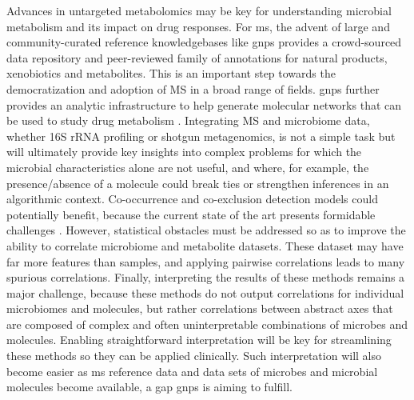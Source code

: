 Advances in untargeted metabolomics may be key for understanding microbial metabolism and its impact on drug responses. For \gls{ms}, the advent of large and community-curated reference knowledgebases like \gls{gnps} \cite{RN4182} provides a crowd-sourced data repository and peer-reviewed family of annotations for natural products, xenobiotics and metabolites. This is an important step towards the democratization and adoption of MS in a broad range of fields. \Gls{gnps} further provides an analytic infrastructure to help generate molecular networks \cite{RN4183} that can be used to study drug metabolism \cite{RN4184}. Integrating MS and microbiome data, whether 16S rRNA profiling or shotgun metagenomics, is not a simple task but will ultimately provide key insights into complex problems for which the microbial characteristics alone are not useful, and where, for example, the presence/absence of a molecule could break ties or strengthen inferences in an algorithmic context. Co-occurrence and co-exclusion detection models could potentially benefit, because the current state of the art presents formidable challenges \cite{RN4186, RN4185}. However, statistical obstacles must be addressed so as to improve the ability to  correlate microbiome and metabolite datasets. These dataset may have far more features than samples, and applying pairwise correlations leads to many spurious correlations. Finally, interpreting the results of these methods remains a major challenge, because these methods do not output correlations for individual microbiomes and molecules, but rather correlations between abstract axes that are composed of complex and often uninterpretable combinations of microbes and molecules. Enabling straightforward interpretation will be key for streamlining these methods so they can be applied clinically. Such interpretation will also become easier as \gls{ms} reference data and data sets of microbes and microbial molecules become available, a gap \gls{gnps} is aiming to fulfill.


